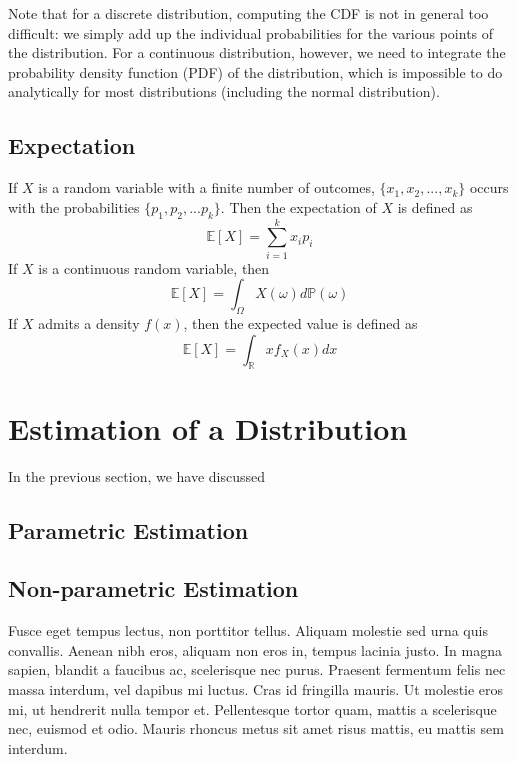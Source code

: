 Note that for a discrete distribution, computing the CDF is not in general too difficult: we simply add up the individual probabilities for the various points of the distribution. 
For a continuous distribution, however, we need to integrate the probability density function (PDF) of the distribution, which is impossible to do analytically for most distributions (including the normal distribution).


\subsection{Expectation}
If $X$ is a random variable with a finite number of outcomes, $\{x_1,x_2,...,x_k\}$ occurs with the probabilities $\{p_1,p_2,...p_k\}$.  Then the expectation of $X$ is defined as
\begin{equation}
  \mathbb{E}[X]=\sum_{i=1}^{k}x_i p_i
\end{equation}
If $X$ is a continuous random variable, then
\begin{equation}
  \mathbb{E}[X]=\int_{\Omega} X(\omega) d\mathbb{P}(\omega)
\end{equation}
If $X$ admits a density $f(x)$, then the expected value is defined as
\begin{equation}
  \mathbb{E}[X]=\int_{\mathbb{R}}x f_{X}(x) dx
\end{equation}

\section{Estimation of a Distribution}

In the previous section, we have discussed

\subsection{Parametric Estimation}



\subsection{Non-parametric Estimation}
 Fusce eget tempus lectus, non porttitor tellus. Aliquam molestie sed urna quis convallis. Aenean nibh eros, aliquam non eros in, tempus lacinia justo. In magna sapien, blandit a faucibus ac, scelerisque nec purus. Praesent fermentum felis nec massa interdum, vel dapibus mi luctus. Cras id fringilla mauris. Ut molestie eros mi, ut hendrerit nulla tempor et. Pellentesque tortor quam, mattis a scelerisque nec, euismod et odio. Mauris rhoncus metus sit amet risus mattis, eu mattis sem interdum.

